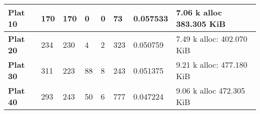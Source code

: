 \begin{table}[]
\begin{tabular}{|l|l|l|l|l|l|l|l|}
\textbf{Plat 10}                                    & 170                                                      & 170                                                        & 0                                                         & 0                                                                                                                                     & 73                                                                                                                    & 0.057533                                                                                                           & 7.06 k alloc 383.305 KiB                           \\ \hline
\textbf{Plat 20}                                    & 234                                                      & 230                                                        & 4                                                         & 2                                                                                                                                     & 323                                                                                                                   & 0.050759                                                                                                           & 7.49 k alloc: 402.070 KiB                          \\ \hline
\textbf{Plat 30}                                    & 311                                                      & 223                                                        & 88                                                        & 8                                                                                                                                     & 243                                                                                                                   & 0.051375                                                                                                           & 9.21 k alloc: 477.180 KiB                          \\ \hline
\textbf{Plat 40}                                    & 293                                                      & 243                                                        & 50                                                        & 6                                                                                                                                     & 777                                                                                                                   & 0.047224                                                                                                           & 9.06 k alloc 472.305 KiB                           \\ \hline

\end{tabular}
\end{table}
